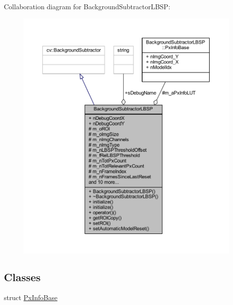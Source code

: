 Collaboration diagram for Background\+Subtractor\+L\+B\+SP\+:\nopagebreak
\begin{figure}[H]
\begin{center}
\leavevmode
\includegraphics[width=350pt]{class_background_subtractor_l_b_s_p__coll__graph}
\end{center}
\end{figure}
\subsection*{Classes}
\begin{DoxyCompactItemize}
\item 
struct \mbox{\hyperlink{struct_background_subtractor_l_b_s_p_1_1_px_info_base}{Px\+Info\+Base}}
\end{DoxyCompactItemize}
